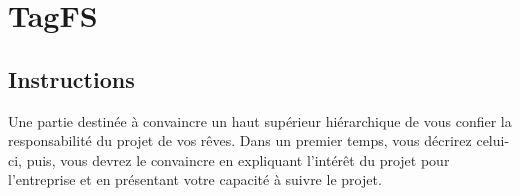 \chapter{TagFS}

\section{Instructions}

\color{red}
Une partie destinée à convaincre un haut supérieur hiérarchique de vous confier la responsabilité du projet de vos rêves. Dans un premier temps, vous décrirez celui-ci, puis, vous devrez le convaincre en expliquant l’intérêt du projet pour l’entreprise et en présentant votre capacité à suivre le projet.
\color{black}

\clearpage


\clearpage

